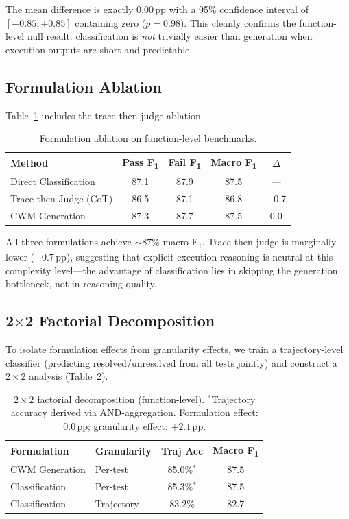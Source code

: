 \documentclass[11pt,a4paper]{article}
\newcommand{\fone}{F\textsubscript{1}}
\newcommand{\pp}{\,\text{pp}}
\begin{document}
The mean difference is exactly $0.00\pp$ with a 95\% confidence interval of $[-0.85, +0.85]$ containing zero ($p{=}0.98$).
This cleanly confirms the function-level null result: classification is \emph{not} trivially easier than generation when execution outputs are short and predictable.

\subsection{Formulation Ablation}

Table~\ref{tab:ablation} includes the trace-then-judge ablation.

\begin{table}[t]
\centering
\small
\begin{tabular}{lcccc}
\toprule
\textbf{Method} & \textbf{Pass \fone} & \textbf{Fail \fone} & \textbf{Macro \fone} & \textbf{$\Delta$} \\
\midrule
Direct Classification & 87.1 & 87.9 & 87.5 & --- \\
Trace-then-Judge (CoT) & 86.5 & 87.1 & 86.8 & $-$0.7 \\
CWM Generation & 87.3 & 87.7 & 87.5 & 0.0 \\
\bottomrule
\end{tabular}
\caption{Formulation ablation on function-level benchmarks.}
\label{tab:ablation}
\end{table}

All three formulations achieve ${\sim}87\%$ macro \fone{}.
Trace-then-judge is marginally lower ($-0.7\pp$), suggesting that explicit execution reasoning is neutral at this complexity level---the advantage of classification lies in skipping the generation bottleneck, not in reasoning quality.

\subsection{2$\times$2 Factorial Decomposition}

To isolate formulation effects from granularity effects, we train a trajectory-level classifier (predicting resolved/unresolved from all tests jointly) and construct a $2{\times}2$ analysis (Table~\ref{tab:factorial}).

\begin{table}[t]
\centering
\small
\begin{tabular}{llcc}
\toprule
\textbf{Formulation} & \textbf{Granularity} & \textbf{Traj Acc} & \textbf{Macro \fone} \\
\midrule
CWM Generation & Per-test & 85.0\%$^*$ & 87.5 \\
Classification & Per-test & 85.3\%$^*$ & 87.5 \\
Classification & Trajectory & 83.2\% & 82.7 \\
\bottomrule
\end{tabular}
\caption{$2{\times}2$ factorial decomposition (function-level). $^*$Trajectory accuracy derived via AND-aggregation. Formulation effect: $0.0\pp$; granularity effect: $+2.1\pp$.}
\label{tab:factorial}
\end{table}
\end{document}
